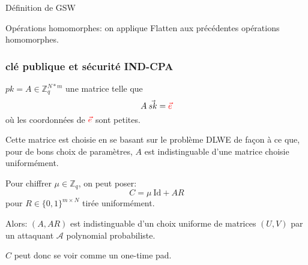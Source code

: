 \documentclass[10pt,xcolor={usenames,dvipsnames}]{beamer}
\newcommand{\ZZq}{\mathbb{Z}_q}
\begin{document}
\begin{section}{Définition de GSW}
\begin{frame}
Opérations homomorphes: on applique Flatten aux précédentes opérations homomorphes.

\end{frame} 
  
  
\begin{frame} 
\frametitle{clé publique et sécurité IND-CPA}

$pk = A \in \ZZq^{N * m}$ une matrice telle que
\[ A\: \vec{sk} = {\color{red} \vec{e}} \]
où les coordonnées de $\color{red}\vec{e}$ sont petites.

Cette matrice est choisie en se basant sur le problème DLWE de façon à ce que, 
pour de bons choix de paramètres, $A$ est indistinguable d'une matrice
choisie uniformément.

Pour chiffrer $\mu \in \ZZq$, on peut poser:
\[ C =\mu\:\text{Id} + A R \]
pour $R\in {\{0,1\}}^{m \times N}$ tirée uniformément.

Alors: $(A,AR)$ est indistinguable d'un choix uniforme de matrices $(U,V)$
par un attaquant $\mathcal{A}$ polynomial probabiliste.

$C$ peut donc se voir comme un one-time pad.
\end{frame} 


\end{section}
\end{document}
